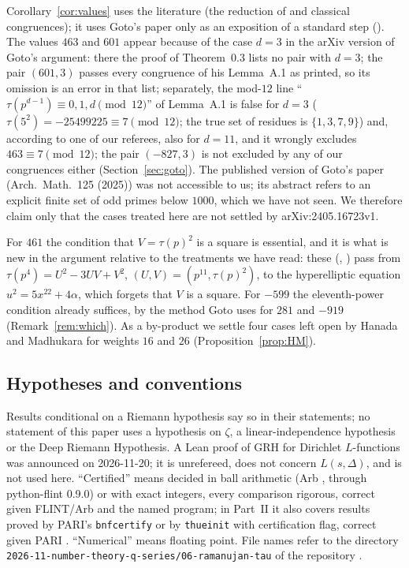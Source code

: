 \documentclass[11pt]{amsart}
\theoremstyle{definition}
\numberwithin{equation}{section}
\newcommand{\repo}{\texttt{2026-11-number-theory-q-series/06-ramanujan-tau}}
\begin{document}
Corollary~\ref{cor:values} uses the literature (the reduction of \cite{BCOT} and classical congruences); it uses Goto's paper only as an exposition of a standard step (\cite[\S3.1]{Goto}). The values $463$ and $601$ appear because of the case $d=3$ in the arXiv version of Goto's argument: there the proof of Theorem~0.3 lists no pair with $d=3$; the pair $(601,3)$ passes every congruence of his Lemma~A.1 as printed, so its omission is an error in that list; separately, the mod-$12$ line ``$\tau(p^{d-1})\equiv0,1,d\pmod{12}$'' of Lemma~A.1 is false for $d=3$ ($\tau(5^2)=-25499225\equiv7\pmod{12}$; the true set of residues is $\{1,3,7,9\}$) and, according to one of our referees, also for $d=11$, and it wrongly excludes $463\equiv7\pmod{12}$; the pair $(-827,3)$ is not excluded by any of our congruences either (Section~\ref{sec:goto}). The published version of Goto's paper \cite{Goto} (Arch.\ Math.\ 125 (2025)) was not accessible to us; its abstract refers to an explicit finite set of odd primes below $1000$, which we have not seen. We therefore claim only that the cases treated here are not settled by arXiv:2405.16723v1.

For $461$ the condition that $V=\tau(p)^2$ is a square is essential, and it is what is new in the argument relative to the treatments we have read: these (\cite{BCOT,DJ,Goto}, \cite{Angdinata}) pass from $\tau(p^4)=U^2-3UV+V^2$, $(U,V)=(p^{11},\tau(p)^2)$, to the hyperelliptic equation $u^2=5x^{22}+4\alpha$, which forgets that $V$ is a square. For $-599$ the eleventh-power condition already suffices, by the method Goto uses for $281$ and $-919$ (Remark~\ref{rem:which}). As a by-product we settle four cases left open by Hanada and Madhukara for weights $16$ and $26$ (Proposition~\ref{prop:HM}).

\subsection{Hypotheses and conventions}
Results conditional on a Riemann hypothesis say so in their statements; no statement of this paper uses a hypothesis on $\zeta$, a linear-independence hypothesis or the Deep Riemann Hypothesis. A Lean proof of GRH for Dirichlet $L$-functions was announced on 2026-11-20; it is unrefereed, does not concern $L(s,\Delta)$, and is not used here. ``Certified'' means decided in ball arithmetic (Arb \cite{Arb}, through python-flint 0.9.0) or with exact integers, every comparison rigorous, correct given FLINT/Arb and the named program; in Part~II it also covers results proved by PARI's \texttt{bnfcertify} or by \texttt{thueinit} with certification flag, correct given PARI \cite{PARI}. ``Numerical'' means floating point. File names refer to the directory \repo{} of the repository \cite{Repo}.
\end{document}
